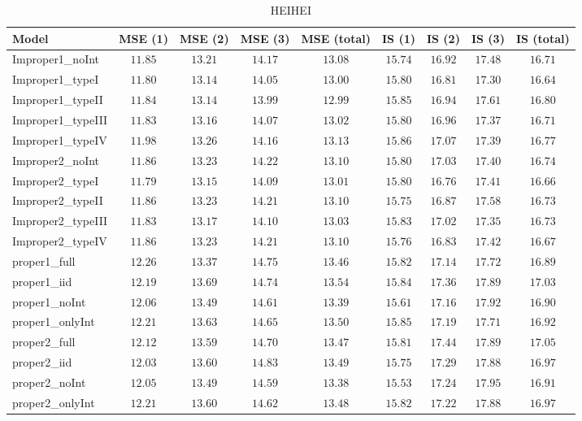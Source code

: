 \begin{table}

\caption{\label{tab:model-choice-sc3}HEIHEI}
\centering
\begin{tabular}{lcccccccc}
\hline
Model  & MSE (1) & MSE (2) & MSE (3) & MSE (total) & IS (1) & IS (2) & IS (3) & \multicolumn{1}{c}{IS (total)} \\ 
\hline
Improper1_noInt  & $11.85$ & $13.21$ & $14.17$ & $13.08$ & $15.74$ & $16.92$ & $17.48$ & $16.71$ \\
Improper1_typeI  & $11.80$ & $13.14$ & $14.05$ & $13.00$ & $15.80$ & $16.81$ & $17.30$ & $16.64$ \\
Improper1_typeII  & $11.84$ & $13.14$ & $13.99$ & $12.99$ & $15.85$ & $16.94$ & $17.61$ & $16.80$ \\
Improper1_typeIII  & $11.83$ & $13.16$ & $14.07$ & $13.02$ & $15.80$ & $16.96$ & $17.37$ & $16.71$ \\
Improper1_typeIV  & $11.98$ & $13.26$ & $14.16$ & $13.13$ & $15.86$ & $17.07$ & $17.39$ & $16.77$ \\
Improper2_noInt  & $11.86$ & $13.23$ & $14.22$ & $13.10$ & $15.80$ & $17.03$ & $17.40$ & $16.74$ \\
Improper2_typeI  & $11.79$ & $13.15$ & $14.09$ & $13.01$ & $15.80$ & $16.76$ & $17.41$ & $16.66$ \\
Improper2_typeII  & $11.86$ & $13.23$ & $14.21$ & $13.10$ & $15.75$ & $16.87$ & $17.58$ & $16.73$ \\
Improper2_typeIII  & $11.83$ & $13.17$ & $14.10$ & $13.03$ & $15.83$ & $17.02$ & $17.35$ & $16.73$ \\
Improper2_typeIV  & $11.86$ & $13.23$ & $14.21$ & $13.10$ & $15.76$ & $16.83$ & $17.42$ & $16.67$ \\
proper1_full  & $12.26$ & $13.37$ & $14.75$ & $13.46$ & $15.82$ & $17.14$ & $17.72$ & $16.89$ \\
proper1_iid  & $12.19$ & $13.69$ & $14.74$ & $13.54$ & $15.84$ & $17.36$ & $17.89$ & $17.03$ \\
proper1_noInt  & $12.06$ & $13.49$ & $14.61$ & $13.39$ & $15.61$ & $17.16$ & $17.92$ & $16.90$ \\
proper1_onlyInt  & $12.21$ & $13.63$ & $14.65$ & $13.50$ & $15.85$ & $17.19$ & $17.71$ & $16.92$ \\
proper2_full  & $12.12$ & $13.59$ & $14.70$ & $13.47$ & $15.81$ & $17.44$ & $17.89$ & $17.05$ \\
proper2_iid  & $12.03$ & $13.60$ & $14.83$ & $13.49$ & $15.75$ & $17.29$ & $17.88$ & $16.97$ \\
proper2_noInt  & $12.05$ & $13.49$ & $14.59$ & $13.38$ & $15.53$ & $17.24$ & $17.95$ & $16.91$ \\
proper2_onlyInt  & $12.21$ & $13.60$ & $14.62$ & $13.48$ & $15.82$ & $17.22$ & $17.88$ & $16.97$ \\
\hline 
\end{tabular}


\end{table}